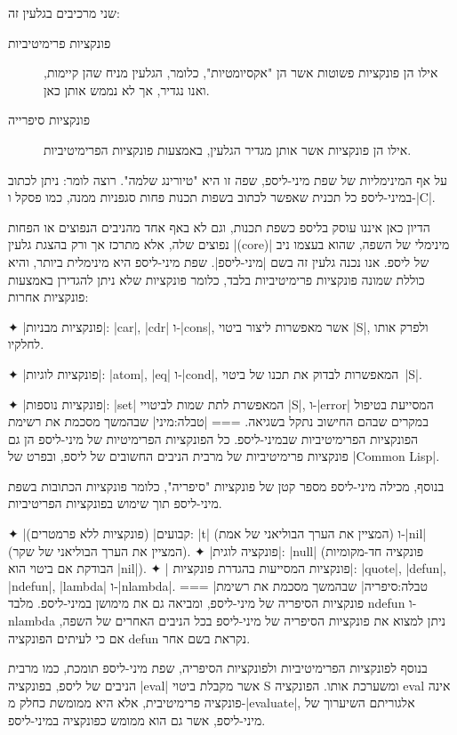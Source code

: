 שני מרכיבים בגלעין זה: 
\begin{description}
  \item[פונקציות פרימיטיביות] אילו הן פונקציות פשוטות אשר הן "אקסיומטיות", כלומר, הגלעין מניח שהן קיימות, ואנו נגדיר, אך לא נממש אותן כאן.
  \item[פונקציות סיפרייה] אילו הן פונקציות אשר אותן מגדיר הגלעין, באמצעות פונקציות הפרימיטיביות. 
\end{description}

על אף המינימליות של שפת מיני-ליספ, שפה זו היא "טיורינג שלמה". רוצה לומר: ניתן
לכתוב במיני-ליספ כל תכנית שאפשר לכתוב בשפות תכנות פחות סגפניות ממנה, כמו פסקל
ו-\E|C|. 

הדיון כאן איננו עוסק בליספ כשפת תכנות, וגם לא באף אחד מהניבים הנפוצים או הפחות
נפוצים שלה, אלא מתרכז אך ורק בהצגת גלעין \E|(core)| מינימלי של השפה, שהוא בעצמו
ניב של ליספ. אנו נכנה גלעין זה בשם \ע|מיני-ליספ|. שפת מיני-ליספ היא מינימלית
ביותר, והיא כוללת שמונה פונקציות פרימיטיביות בלבד, כלומר פונקציות שלא ניתן
להגדירן באמצעות פונקציות אחרות:

✦ \ע|פונקציות מבניות|: \E|car|, \E|cdr| ו-\E|cons|, אשר מאפשרות ליצור ביטוי
\E|S|, ולפרק אותו לחלקיו.

✦ \ע|פונקציות לוגיות|: \E|atom|, \E|eq| ו-\E|cond|, המאפשרות לבדוק את תכנו של
ביטוי~\E|S|.

✦ \ע|פונקציות נוספות|: \E|set| המאפשרת לתת שמות לביטויי \E|S|, ו-\E|error|
המסייעת בטיפול במקרים שבהם החישוב נתקל בשגיאה.
===
|טבלה:מיני| שבהמשך מסכמת את רשימת הפונקציות הפרימיטיביות שבמיני-ליספ. כל
הפונקציות הפרימיטיות של מיני-ליספ הן גם פונקציות פרימיטיביות של מרבית הניבים
החשובים של ליספ, ובפרט של \E|Common Lisp|.

בנוסף, מכילה מיני-ליספ מספר קטן של פונקציות "סיפריה", כלומר פונקציות הכתובות
בשפת מיני-ליספ תוך שימוש בפונקציות הפריטיביות.

✦ \ע|קבועים| (פונקציות ללא פרמטרים): \E|t| (המציין את הערך הבוליאני של אמת) ו-\E|nil|
(המציין את הערך הבוליאני של שקר).
✦ \ע|פונקציה לוגית|: \E|null| (פונקציה חד-מקומיות הבודקת אם ביטוי הוא \E|nil|).
✦ \ע| פונקציות המסייעות בהגדרת פונקציות|:
\E|quote|, \E|defun|, \E|ndefun|, \E|lambda| ו-\E|nlambda|.
===
|טבלה:סיפריה| שבהמשך מסכמת את רשימת פונקציות הסיפריה של מיני-ליספ, ומביאה
גם את מימושן במיני-ליספ. מלבד ndefun ו-nlambda ניתן למצוא את פונקציות הסיפריה
של מיני-ליספ בכל הניבים האחרים של השפה, אם כי לעיתים הפונקציה defun נקראת בשם
אחר.

בנוסף לפונקציות הפרימיטיביות ולפונקציות הסיפריה, שפת מיני-ליספ תומכת, כמו מרבית
הניבים של ליספ, בפונקציה \E|eval| אשר מקבלת ביטוי S ומשערכת אותו. הפונקציה
eval אינה פונקציה פרימיטיבית, אלא היא ממומשת כחלק מ-\E|evaluate|, אלגוריתם
השיערוך של מיני-ליספ, אשר גם הוא ממומש כפונקציה במיני-ליספ.

